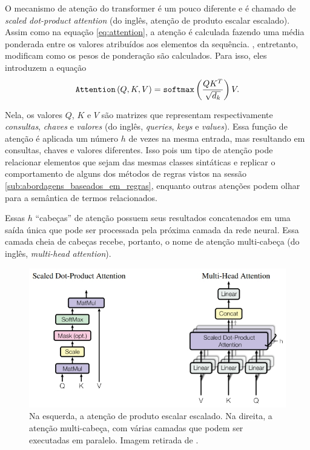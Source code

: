 O mecanismo de atenção do transformer é um pouco diferente e é chamado de
\textit{scaled dot-product attention} (do inglês, atenção de produto escalar
escalado). Assim como na equação \ref{eq:attention}, a atenção é calculada
fazendo uma média ponderada entre os valores atribuídos aos elementos da
sequência. \cite{vaswani-etal:2017:attention-is-all-you-need}, entretanto,
modificam como os pesos de ponderação são calculados. Para isso, eles introduzem
a equação
\begin{equation}
  \texttt{Attention}\left( Q, K, V \right)
  =\texttt{softmax}\left( \dfrac{QK^{T}}{\sqrt{d_k}} \right)V.
  \label{eq:self-attention}
\end{equation}

Nela, os valores $Q$, $K$ e $V$ são matrizes que representam respectivamente
\textit{consultas}, \textit{chaves} e \textit{valores} (do inglês,
\textit{queries}, \textit{keys} e \textit{values}). Essa função de atenção é
aplicada um número $h$ de vezes na mesma entrada, mas resultando em consultas,
chaves e valores diferentes. Isso pois um tipo de atenção pode relacionar
elementos que sejam das mesmas classes sintáticas e replicar o comportamento de
alguns dos métodos de regras vistos na sessão
\ref{sub:abordagens_baseados_em_regras}, enquanto outras atenções podem
olhar para a semântica de termos relacionados.

Essas $h$ ``cabeças'' de atenção possuem seus resultados concatenados em uma
saída única que pode ser processada pela próxima camada da rede neural. Essa
camada cheia de cabeças recebe, portanto, o nome de atenção multi-cabeça (do
inglês, \textit{multi-head attention}).

\begin{figure}[h]
\centering
\includegraphics[scale=0.6]{Res/transformers-img2.jpg}
\caption{Na esquerda, a atenção de produto escalar escalado. Na direita, a
atenção multi-cabeça, com várias camadas que podem ser executadas em paralelo.
Imagem retirada de \cite{vaswani-etal:2017:attention-is-all-you-need}.}
\label{transformers-img2.jpg}
\end{figure}



